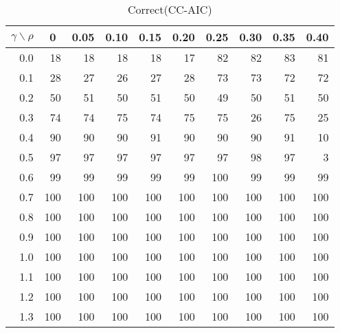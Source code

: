 \documentclass[12pt]{article}
\begin{document}
%
\begin{table}[!tbp]
\caption{Correct(CC-AIC)}
 \begin{center}
 \begin{tabular}{r|rrrrrrrrr}\hline\hline
\multicolumn{1}{c|}{$\gamma\backslash\rho$}&\multicolumn{1}{c}{0}&\multicolumn{1}{c}{0.05}&\multicolumn{1}{c}{0.10}&\multicolumn{1}{c}{0.15}&\multicolumn{1}{c}{0.20}&\multicolumn{1}{c}{0.25}&\multicolumn{1}{c}{0.30}&\multicolumn{1}{c}{0.35}&\multicolumn{1}{c}{0.40}\tabularnewline
\hline
0.0& 18& 18& 18& 18& 17& 82& 82& 83& 81\tabularnewline
0.1& 28& 27& 26& 27& 28& 73& 73& 72& 72\tabularnewline
0.2& 50& 51& 50& 51& 50& 49& 50& 51& 50\tabularnewline
0.3& 74& 74& 75& 74& 75& 75& 26& 75& 25\tabularnewline
0.4& 90& 90& 90& 91& 90& 90& 90& 91& 10\tabularnewline
0.5& 97& 97& 97& 97& 97& 97& 98& 97&  3\tabularnewline
0.6& 99& 99& 99& 99& 99&100& 99& 99& 99\tabularnewline
0.7&100&100&100&100&100&100&100&100&100\tabularnewline
0.8&100&100&100&100&100&100&100&100&100\tabularnewline
0.9&100&100&100&100&100&100&100&100&100\tabularnewline
1.0&100&100&100&100&100&100&100&100&100\tabularnewline
1.1&100&100&100&100&100&100&100&100&100\tabularnewline
1.2&100&100&100&100&100&100&100&100&100\tabularnewline
1.3&100&100&100&100&100&100&100&100&100\tabularnewline
\hline
\end{tabular}

\end{center}

\end{table}
\end{document}
